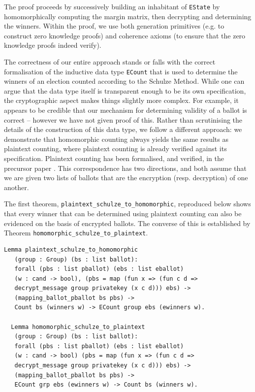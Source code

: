\noindent
The proof proceeds by successively building an inhabitant of
\texttt{EState} by homomorphically computing the margin matrix, then
decrypting and determining the winners. Within the proof, we use
both generation primitives (e.g. to construct zero knowledge proofs)
and coherence axioms (to ensure that the zero knowledge proofs
indeed verify). 

The correctness of our entire approach stands or falls with the
correct formalisation of the inductive data type \texttt{ECount}
that is used to determine the winners of an election counted
according to the Schulze Method. While one can argue that the data
type itself is transparent enough to be its own specification,
the cryptographic aspect makes things slightly more complex. For
example, it appears to be credible that our mechanism for
determining validity of a ballot is correct -- however we have not
given proof of this. Rather than scrutinising the details of the
construction of this data type, we follow a different approach: we
demonstrate that homomorphic counting always yields the same results
as plaintext counting, where plaintext counting is already verified
against its specification. Plaintext counting has been formalised,
and verified, in the precursor paper \cite{Pattinson:2017:SVE}. This
correspondence has two directions, and both assume that we are given
two lists of ballots that are the encryption (resp. decryption) of
one another. 

The first theorem, \texttt{plaintext\_schulze\_to\_homomorphic}, reproduced below shows
that every winner that can be determined using plaintext counting
can also be evidenced on the basis of encrypted ballots. The
converse of this is established by 
Theorem \texttt{homomorphic\_schulze\_to\_plaintext}.

\begin{lstlisting}[frame=single,basicstyle=\ttfamily\footnotesize]
  Lemma plaintext_schulze_to_homomorphic 
   (group : Group) (bs : list ballot): 
   forall (pbs : list pballot) (ebs : list eballot) 
   (w : cand -> bool), (pbs = map (fun x => (fun c d => 
   decrypt_message group privatekey (x c d))) ebs) ->
   (mapping_ballot_pballot bs pbs) -> 
   Count bs (winners w) -> ECount group ebs (ewinners w).
      
  Lemma homomorphic_schulze_to_plaintext 
   (group : Group) (bs : list ballot):
   forall (pbs : list pballot) (ebs : list eballot) 
   (w : cand -> bool) (pbs = map (fun x => (fun c d => 
   decrypt_message group privatekey (x c d))) ebs) ->
   (mapping_ballot_pballot bs pbs) ->
   ECount grp ebs (ewinners w) -> Count bs (winners w).
\end{lstlisting}


